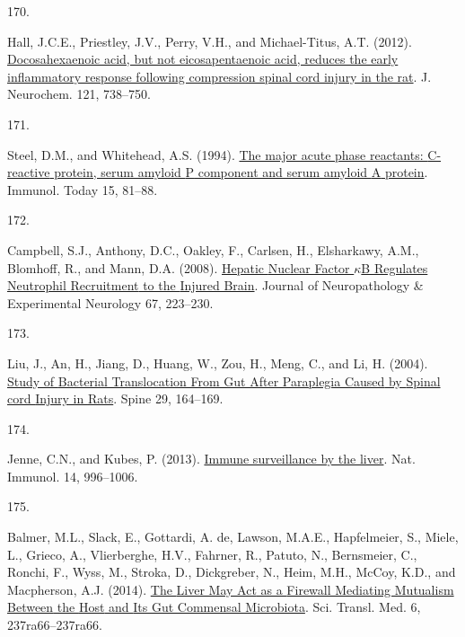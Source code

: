 \documentclass[
]{article}
\newlength{\cslhangindent}
\newlength{\csllabelwidth}
\newlength{\cslentryspacingunit} %
\newenvironment{CSLReferences}[2] %
 {%
  \setlength{\parindent}{0pt}
  \ifodd #1
  \let\oldpar\par
  \def\par{\hangindent=\cslhangindent\oldpar}
  \fi
  \setlength{\parskip}{#2\cslentryspacingunit}
 }%
 {}
\newcommand{\CSLLeftMargin}[1]{\parbox[t]{\csllabelwidth}{#1}}
\newcommand{\CSLRightInline}[1]{\parbox[t]{\linewidth - \csllabelwidth}{#1}\break}
\begin{document}
\begin{CSLReferences}{0}{0}
\leavevmode{}%
\CSLLeftMargin{170. }
\CSLRightInline{Hall, J.C.E., Priestley, J.V., Perry, V.H., and Michael-Titus, A.T. (2012). \href{https://doi.org/10.1111/j.1471-4159.2012.07726.x}{Docosahexaenoic acid, but not eicosapentaenoic acid, reduces the early inflammatory response following compression spinal cord injury in the rat}. J. Neurochem. 121, 738--750.}

\leavevmode{}%
\CSLLeftMargin{171. }
\CSLRightInline{Steel, D.M., and Whitehead, A.S. (1994). \href{https://doi.org/10.1016/0167-5699(94)90138-4}{The major acute phase reactants: {C-reactive} protein, serum amyloid {P} component and serum amyloid {A} protein}. Immunol. Today 15, 81--88.}

\leavevmode{}%
\CSLLeftMargin{172. }
\CSLRightInline{Campbell, S.J., Anthony, D.C., Oakley, F., Carlsen, H., Elsharkawy, A.M., Blomhoff, R., and Mann, D.A. (2008). \href{https://doi.org/10.1097/NEN.0b013e3181654957}{Hepatic {Nuclear Factor \(\kappa\)B Regulates Neutrophil Recruitment} to the {Injured Brain}}. Journal of Neuropathology \& Experimental Neurology 67, 223--230.}

\leavevmode{}%
\CSLLeftMargin{173. }
\CSLRightInline{Liu, J., An, H., Jiang, D., Huang, W., Zou, H., Meng, C., and Li, H. (2004). \href{https://doi.org/10.1097/01.BRS.0000107234.74249.CD}{Study of {Bacterial Translocation From Gut After Paraplegia Caused} by {Spinal} cord {Injury} in {Rats}}. Spine 29, 164--169.}

\leavevmode{}%
\CSLLeftMargin{174. }
\CSLRightInline{Jenne, C.N., and Kubes, P. (2013). \href{https://doi.org/10.1038/ni.2691}{Immune surveillance by the liver}. Nat. Immunol. 14, 996--1006.}

\leavevmode{}%
\CSLLeftMargin{175. }
\CSLRightInline{Balmer, M.L., Slack, E., Gottardi, A. de, Lawson, M.A.E., Hapfelmeier, S., Miele, L., Grieco, A., Vlierberghe, H.V., Fahrner, R., Patuto, N., Bernsmeier, C., Ronchi, F., Wyss, M., Stroka, D., Dickgreber, N., Heim, M.H., McCoy, K.D., and Macpherson, A.J. (2014). \href{https://doi.org/10.1126/scitranslmed.3008618}{The {Liver May Act} as a {Firewall Mediating Mutualism Between} the {Host} and {Its Gut Commensal Microbiota}}. Sci. Transl. Med. 6, 237ra66--237ra66.}


\end{CSLReferences}
\end{document}
